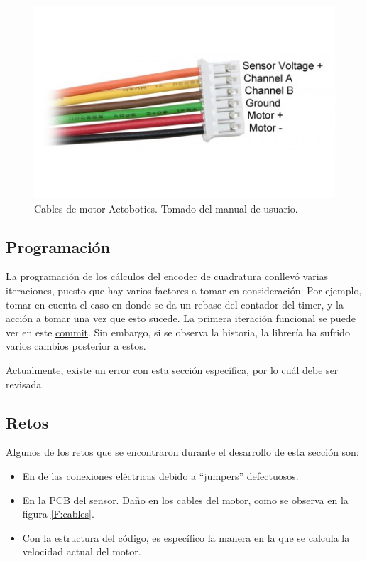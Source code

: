 \begin{figure}[h!]
\centering
\includegraphics[scale=0.8]{imagenes/actoboticscables.jpg}
\caption{Cables de motor Actobotics. Tomado del manual de usuario.}
\label{F:actoboticscables}
\end{figure}

\subsection{Programación}

La programación de los cálculos del encoder de cuadratura conllevó varias iteraciones, puesto que hay varios factores a tomar en consideración. Por ejemplo, tomar en cuenta el caso en donde se da un rebase del contador del timer, y la acción a tomar una vez que esto sucede. La primera iteración funcional se puede ver en este \href{https://github.com/arcoslab/stm32-roboclaw/commit/c81a49b71de4a6a7cb5188abe2c16fd31c0b9cf0#diff-bff6209bf0949743f46f878a7d4c8c2c}{commit}. Sin embargo, si se observa la historia, la librería ha sufrido varios cambios posterior a estos.

Actualmente, existe un error con esta sección específica, por lo cuál debe ser revisada.

\subsection{Retos}

Algunos de los retos que se encontraron durante el desarrollo de esta sección son:

\begin{itemize}
\item En de las conexiones eléctricas debido a ``jumpers'' defectuosos.
\item En la PCB del sensor. Daño en los cables del motor, como se observa en la figura \ref{F:cables}.
\item Con la estructura del código, es específico la manera en la que se calcula la velocidad actual del motor.
\end{itemize}

